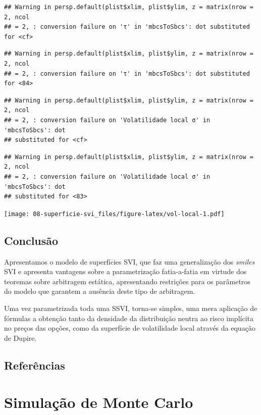 \documentclass[]{book}
\theoremstyle{definition}
\theoremstyle{definition}
\theoremstyle{definition}
\theoremstyle{remark}
\begin{document}
\begin{verbatim}
## Warning in persp.default(plist$xlim, plist$ylim, z = matrix(nrow = 2, ncol
## = 2, : conversion failure on 'τ' in 'mbcsToSbcs': dot substituted for <cf>
\end{verbatim}

\begin{verbatim}
## Warning in persp.default(plist$xlim, plist$ylim, z = matrix(nrow = 2, ncol
## = 2, : conversion failure on 'τ' in 'mbcsToSbcs': dot substituted for <84>
\end{verbatim}

\begin{verbatim}
## Warning in persp.default(plist$xlim, plist$ylim, z = matrix(nrow = 2, ncol
## = 2, : conversion failure on 'Volatilidade local σ' in 'mbcsToSbcs': dot
## substituted for <cf>
\end{verbatim}

\begin{verbatim}
## Warning in persp.default(plist$xlim, plist$ylim, z = matrix(nrow = 2, ncol
## = 2, : conversion failure on 'Volatilidade local σ' in 'mbcsToSbcs': dot
## substituted for <83>
\end{verbatim}

\texttt{[image: 08-superficie-svi\_files/figure-latex/vol-local-1.pdf]}

\hypertarget{conclusao-4}{%
\section{Conclusão}\label{conclusao-4}}

Apresentamos o modelo de superfícies SVI, que faz uma generalização dos \emph{smiles} SVI e apresenta vantagens sobre a parametrização fatia-a-fatia em virtude dos teoremas sobre arbitragem estática, apresentando restrições para os parâmetros do modelo que garantem a ausência deste tipo de arbitragem.

Uma vez parametrizada toda uma SSVI, torna-se simples, uma mera aplicação de fórmulas a obtenção tanto da densidade da distribuição neutra ao risco implícita no preços das opções, como da superfície de volatilidade local através da equação de Dupire.

\hypertarget{referencias-1}{%
\section{Referências}\label{referencias-1}}

\hypertarget{monte-carlo}{%
\chapter{Simulação de Monte Carlo}\label{monte-carlo}}
\end{document}
